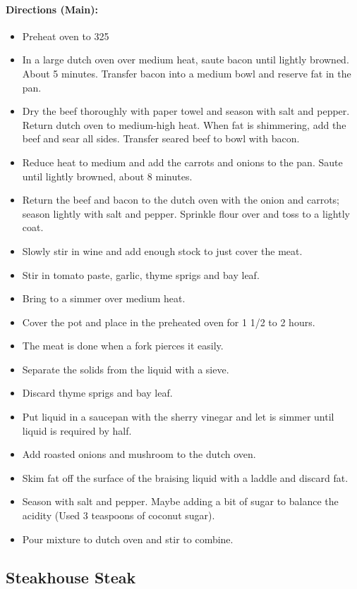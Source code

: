 \documentclass{article}
\begin{document}
\paragraph{Directions (Main):}
\begin{itemize}
\item Preheat oven to 325
\item In a large dutch oven over medium heat, saute bacon until lightly browned. About 5 minutes. Transfer bacon into a medium bowl and reserve fat in the pan.
\item Dry the beef thoroughly with paper towel and season with salt and pepper. Return dutch oven to medium-high heat. When fat is shimmering, add the beef and sear all sides. Transfer seared beef to bowl with bacon.
\item Reduce heat to medium and add the carrots and onions to the pan. Saute until lightly browned, about 8 minutes.
\item Return the beef and bacon to the dutch oven with the onion and carrots; season lightly with salt and pepper. Sprinkle flour over and toss to a lightly coat.
\item Slowly stir in wine and add enough stock to just cover the meat.
\item Stir in tomato paste, garlic, thyme sprigs and bay leaf.
\item Bring to a simmer over medium heat. 
\item Cover the pot and place in the preheated oven for 1 1/2 to 2 hours.
\item The meat is done when a fork pierces it easily.
\item Separate the solids from the liquid with a sieve.
\item Discard thyme sprigs and bay leaf.
\item Put liquid in a saucepan with the sherry vinegar and let is simmer until liquid is required by half.
\item Add roasted onions and mushroom to the dutch oven.
\item Skim fat off the surface of the braising liquid with a laddle and discard fat.
\item Season with salt and pepper. Maybe adding a bit of sugar to balance the acidity (Used 3 teaspoons of coconut sugar).
\item Pour mixture to dutch oven and stir to combine.
\end{itemize}

\subsection{Steakhouse Steak}
\end{document}
